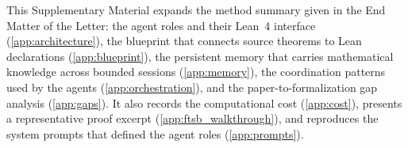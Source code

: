 %
\makeatletter
\setcounter{figure}{0}
\setcounter{equation}{0}
\setcounter{table}{0}
\renewcommand{\thefigure}{S\@arabic\c@figure}
\renewcommand{\theequation}{S\@arabic\c@equation}
\renewcommand{\thetable}{S\@arabic\c@table}
\renewcommand{\theHfigure}{S\@arabic\c@figure}
\renewcommand{\theHequation}{S\@arabic\c@equation}
\renewcommand{\theHtable}{S\@arabic\c@table}
\makeatother


This Supplementary Material expands the method summary given in the End Matter of the Letter: the agent
roles and their Lean~4 interface (\cref{app:architecture}), the blueprint that connects source theorems to Lean declarations (\cref{app:blueprint}), the
persistent memory that carries mathematical knowledge across bounded sessions
(\cref{app:memory}), the coordination patterns used by the agents
(\cref{app:orchestration}), and the paper-to-formalization gap analysis
(\cref{app:gaps}). It also records the computational cost (\cref{app:cost}), presents a representative proof excerpt (\cref{app:ftsb_walkthrough}), and reproduces the system prompts that defined the agent roles (\cref{app:prompts}).

\tableofcontents




\let\addcontentsline\SMrealaddcontentsline{}

\renewcommand{\addcontentsline}[3]{}
